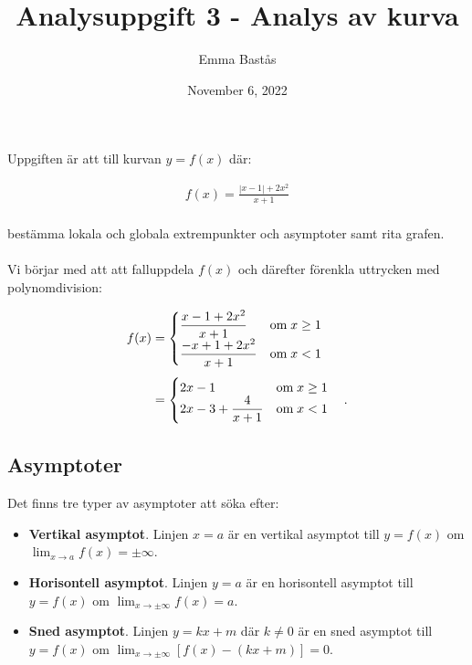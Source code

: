 \documentclass{article}
\title{Analysuppgift 3 - Analys av kurva}
\author{Emma Bastås}
\date{November 6, 2022}
\begin{document}
\maketitle

\noindent Uppgiften är att till kurvan $y = f(x)$ där:

\begin{gather*}
  f(x) = \frac{|x-1| + 2x^{2}}{x + 1}
\end{gather*}
\\
bestämma lokala och globala extrempunkter och asymptoter samt rita grafen.
\\
\\
Vi börjar med att att falluppdela $f(x)$ och därefter förenkla uttrycken med polynomdivision:

\begin{align}
  f(x) &=
         \begin{cases}
           \begin{aligned}[t]
             & \frac{x - 1 + 2x^{2}}{x+1} & \text{om} \; x \geq 1 \\
             & \frac{-x + 1 +2x^{2}}{x+1} & \text{om} \; x < 1
           \end{aligned}
         \end{cases} \notag \\[4pt]
       & =
         \begin{cases}
           \begin{aligned}[t]
             & 2x - 1 & \text{om} \; x \geq 1 \\
             & 2x - 3 + \frac{4}{x + 1} & \text{om} \; x < 1
          \end{aligned}
         \end{cases}\text{.} \label{cases}
\end{align}


\subsection*{Asymptoter}

Det finns tre typer av asymptoter att söka efter:

\begin{itemize}
        \item \textbf{Vertikal asymptot}. Linjen $x = a$ är en vertikal asymptot till $y = f(x)$ om $\lim_{x \to a}f(x) = \pm\infty$.
        \item \textbf{Horisontell asymptot}. Linjen $y = a$ är en horisontell asymptot till $y = f(x)$ om $\lim_{x \to \pm\infty}f(x) = a$.
        \item \textbf{Sned asymptot}. Linjen $y = kx + m$ där $k \neq 0$ är en sned asymptot till $y = f(x)$ om $\lim_{x \to \pm\infty}[f(x) - (kx +m)] = 0$.
\end{itemize}
\end{document}
